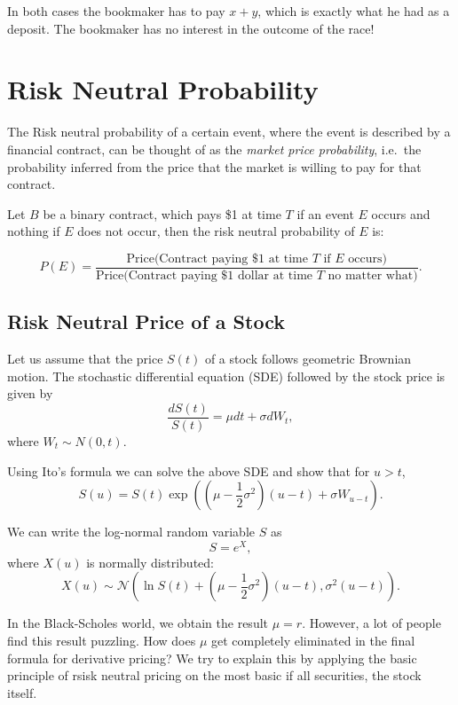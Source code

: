 \documentclass{amsart}
\theoremstyle{plain}
\numberwithin{equation}{section}
\begin{document}
In both cases the bookmaker has to pay $x+y$, which is exactly 
what he had as a deposit. The bookmaker has no interest 
in the outcome of the race!

\section*{Risk Neutral Probability}
The Risk neutral probability of a certain
event, where the event is described by a financial
contract, can be thought of as the 
\emph{market price probability}, 
i.e.\ the probability inferred from the price 
that the market is willing to pay for 
that contract.

Let $B$ be a binary contract, which 
pays \$1 at time $T$ if an event $E$ occurs and 
nothing if $E$ does not occur, then the 
risk neutral probability of $E$ 
is:

$$
P(E) = \frac{\mbox{Price(Contract paying \$1 at time $T$ if $E$ occurs)}}
{\mbox{Price(Contract paying \$1 dollar at time $T$ no matter what)}}.
$$

\subsection*{Risk Neutral Price of a Stock}
Let us assume that the price $S(t)$ of a stock 
follows geometric Brownian motion. The stochastic 
differential equation (SDE) followed
by the stock price is given by
\begin{equation*}
\frac{dS(t)}{S(t)} = \mu dt + \sigma dW_t,
\end{equation*}
where $W_t \sim N(0, t)$. 

Using Ito's formula we can solve the above 
SDE and show that for $u>t$,
\begin{equation*}
S(u) = S(t)\exp\left((\mu - \frac{1}{2}\sigma^2)(u-t)+\sigma W_{u-t}\right).
\end{equation*}

We can write the log-normal 
random variable $S$ as
\begin{equation}
\label{eq:lognormal}
S=e^{X},
\end{equation}
where $X(u)$ is normally
distributed:
\begin{equation}
X(u) \sim \mathcal{N}\left(\ln S(t) + \left(\mu - \frac{1}{2}\sigma^2\right)(u-t), \sigma^2(u-t)\right).
\end{equation}

In the Black-Scholes world, we obtain the result 
$\mu = r$. However, a lot of people find this result puzzling.
How does $\mu$ get completely eliminated in the final formula 
for derivative pricing? We try to explain this by applying the 
basic principle of rsisk neutral pricing on the most basic if all 
securities, the stock itself. 
\end{document}
